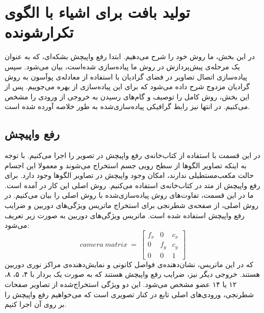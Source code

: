 \section{تولید بافت برای اشیاء با الگوی تکرارشونده}
در این بخش، ما روش خود را شرح می‌دهیم. ابتدا رفع واپیچش بشکه‌ای، که به عنوان یک مرحله‌ی پیش‌پردازش در روش ما پیاده‌سازی شده‌است، بیان می‌شود. سپس پیاده‌سازی اتصال تصاویر در فضای گرادیان با استفاده از معادله‌ی پو‌آسون به روش گرادیان مزدوج شرح داده می‌شود که برای این پیاده‌سازی از \cite{panoramaMaster} بهره می‌جوییم. پس از این بخش، روش کامل را توصیف و گام‌های رسیدن به خروجی از ورودی را مشخص می‌کنیم. در انتها نیز رابط گرافیکی پیاده‌سازی‌شده به طور خلاصه آورده ‌شده است.
\subsection{رفع واپیچش}
در این قسمت با استفاده از کتاب‌خانه‌ی  رفع واپیچش در تصویر را اجرا می‌کنیم. با توجه به اینکه تصاویر الگو‌ها از سطح رویی جسم استخراج می‌شوند و معمولا این اجسام حالت مکعب‌مستطیلی ندارند، امکان وجود واپیچش در تصاویر الگو‌ها وجود دارد. برای رفع واپیچش از متد‌  در کتاب‌خانه‌ی  استفاده می‌کنیم. روش اصلی این کار در \cite{opencvCamCalib} آمده است. ما در این قسمت، تفاوت‌های روش پیاده‌سازی‌شده با روش اصلی را بیان می‌کنیم. در روش اصلی، از صفحه‌ی شطرنجی برای استخراج ماتریس ویژگی‌های دوربین و ضرایب رفع واپیچش استفاده شده است. ماتریس ویژگی‌های دوربین به صورت زیر تعریف می‌شود:
\begin{equation}
	camera\ matrix\ =\ \begin{bmatrix}
		f_x & 0 & c_x \\
		0 & f_y & c_y \\
		0 & 0 & 1
	\end{bmatrix}
\end{equation}
که در این ماتریس،  نشان‌دهنده‌ی فواصل کانونی و  نمایش‌دهنده‌ی مراکز نوری دوربین هستند. خروجی دیگر نیز، ضرایب رفع واپیچش هستند که به صورت یک بردار‌ با ۴، ۵، ۸، ۱۲  یا ۱۴ عضو مشخص می‌شود. این دو ویژگی استخراج‌شده از تصاویر صفحات شطرنجی، ورودی‌های اصلی تابع  در کنار تصویری است که می‌خواهیم رفع واپیچش را بر روی آن اجرا کنیم.


